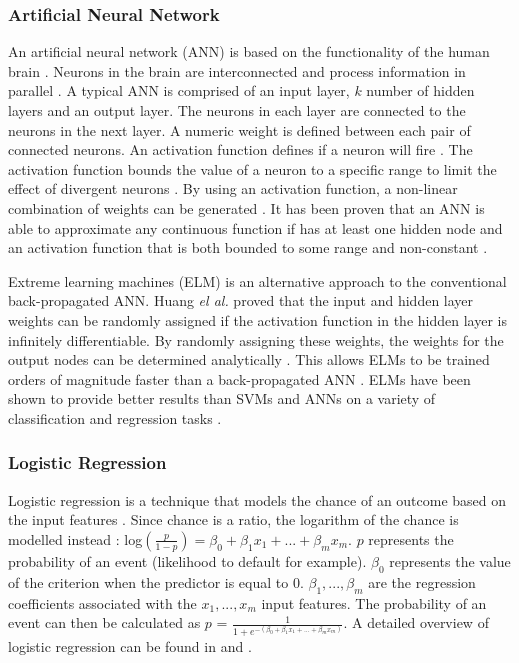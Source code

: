 \documentclass{sig-alternate-05-2015}
\begin{document}
	\subsubsection{Artificial Neural Network}
	An artificial neural network (ANN) is based on the functionality of the human brain \cite{Wang2003}. Neurons in the brain are interconnected and process information in parallel \cite{Wang2003}. A typical ANN is comprised of an input layer, $k$ number of hidden layers and an output layer. The neurons in each layer are connected to the neurons in the next layer. A numeric weight is defined between each pair of connected neurons. An activation function defines if a neuron will fire \cite{Wang2003}. The activation function bounds the value of a neuron to a specific range to limit the effect of divergent neurons \cite{Wang2003}. By using an activation function, a non-linear combination of weights can be generated \cite{Wang2003}. It has been proven that an ANN is able to approximate any continuous function if has at least one hidden node and an activation function that is both bounded to some range and non-constant \cite{Hornik1991251}.
	
	Extreme learning machines (ELM) is an alternative approach to the conventional back-propagated ANN. Huang \textit{el al.} \cite{Huang2006489} proved that the input and hidden layer weights can be randomly assigned if the activation function in the hidden layer is infinitely differentiable. By randomly assigning these weights, the weights for the output nodes can be determined analytically \cite{Huang2006489}. This allows ELMs to be trained orders of magnitude faster than a back-propagated ANN \cite{6035797, Huang2006489}. ELMs have been shown to provide better results than SVMs and ANNs on a variety of classification and regression tasks \cite{6035797, Huang2006489}.
	
	\subsubsection{Logistic Regression}
	Logistic regression is a technique that models the chance of an outcome based on the input features \cite{doi:10.11613/BM.2014.003}. Since chance is a ratio, the logarithm of the chance is modelled instead \cite{doi:10.11613/BM.2014.003}:
	log$(\frac{p}{1 - p}) = \beta_0 + \beta_1 x_1 + ... + \beta_m x_m$. $p$ represents the probability of an event (likelihood to default for example). $\beta_0$ represents the value of the criterion when the predictor is equal to 0. $\beta_1, ..., \beta_m$ are the regression coefficients associated with the $x_1, ..., x_m$ input features. The probability of an event can then be calculated as $p$ = $\frac{1}{1 + e^{-(\beta_0 + \beta_1 x_1 + ... + \beta_m x_m)}}$. A detailed overview of logistic regression can be found in \cite{Mood01022010} and \cite{doi:10.11613/BM.2014.003}.
	
\end{document}

